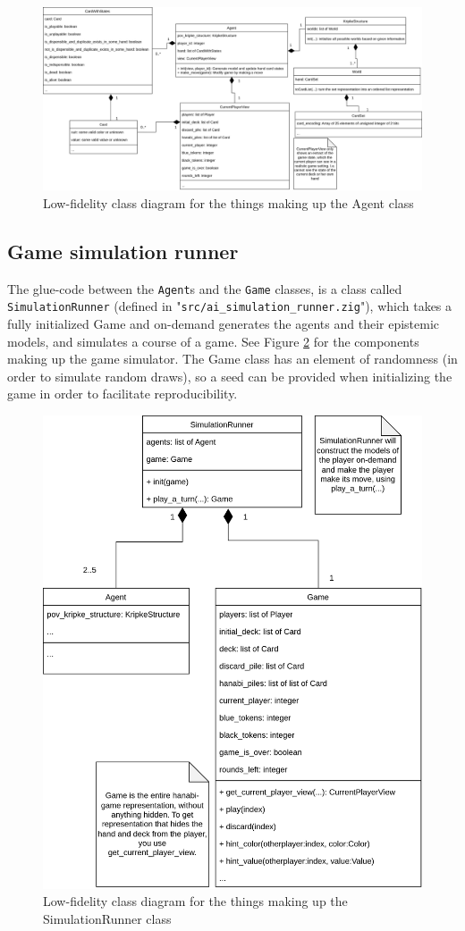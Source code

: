 \begin{figure}
\includegraphics[width=22cm]{images/agent-uml-class-diagram.png}
	\caption{Low-fidelity class diagram for the things making up the Agent class}
	\label{fig:Agent-class-diagram}
\end{figure}

\subsection{Game simulation runner}
The glue-code between the {\tt Agent}s and the {\tt Game} classes, is a class called {\tt SimulationRunner} (defined in "{\tt src/ai\_simulation\_runner.zig}"), which takes a fully initialized Game and on-demand generates the agents and their epistemic models, and simulates a course of a game.
See Figure \ref{fig:SimulationRunner-class-diagram} for the components making up the game simulator.
The Game class has an element of randomness (in order to simulate random draws), so a seed can be provided when initializing the game in order to facilitate reproducibility.

\begin{figure}
	\includegraphics[width=13cm]{images/simulationrunner-uml-class-diagram.png}
	\caption{Low-fidelity class diagram for the things making up the SimulationRunner class}
	\label{fig:SimulationRunner-class-diagram}
\end{figure}
